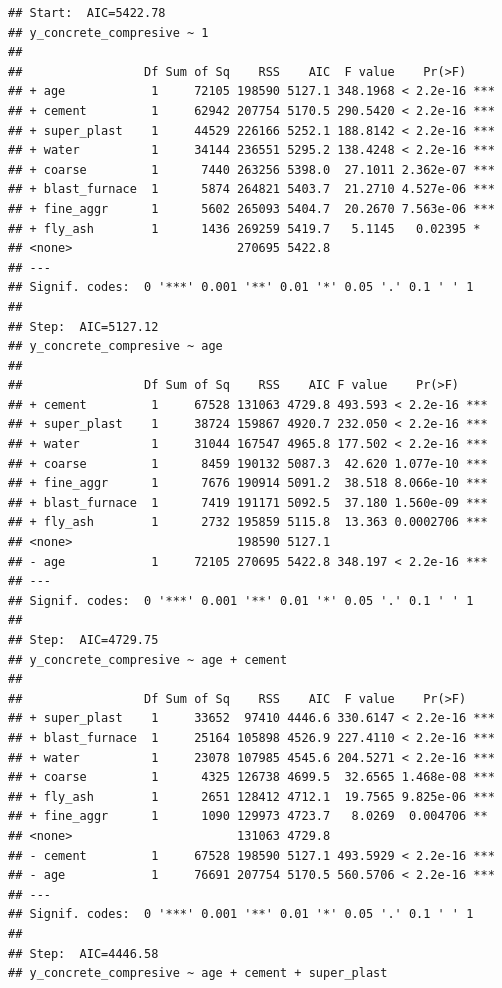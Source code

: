 \documentclass[
  12pt,
]{article}
\begin{document}
\begin{verbatim}
## Start:  AIC=5422.78
## y_concrete_compresive ~ 1
## 
##                 Df Sum of Sq    RSS    AIC  F value    Pr(>F)    
## + age            1     72105 198590 5127.1 348.1968 < 2.2e-16 ***
## + cement         1     62942 207754 5170.5 290.5420 < 2.2e-16 ***
## + super_plast    1     44529 226166 5252.1 188.8142 < 2.2e-16 ***
## + water          1     34144 236551 5295.2 138.4248 < 2.2e-16 ***
## + coarse         1      7440 263256 5398.0  27.1011 2.362e-07 ***
## + blast_furnace  1      5874 264821 5403.7  21.2710 4.527e-06 ***
## + fine_aggr      1      5602 265093 5404.7  20.2670 7.563e-06 ***
## + fly_ash        1      1436 269259 5419.7   5.1145   0.02395 *  
## <none>                       270695 5422.8                       
## ---
## Signif. codes:  0 '***' 0.001 '**' 0.01 '*' 0.05 '.' 0.1 ' ' 1
## 
## Step:  AIC=5127.12
## y_concrete_compresive ~ age
## 
##                 Df Sum of Sq    RSS    AIC F value    Pr(>F)    
## + cement         1     67528 131063 4729.8 493.593 < 2.2e-16 ***
## + super_plast    1     38724 159867 4920.7 232.050 < 2.2e-16 ***
## + water          1     31044 167547 4965.8 177.502 < 2.2e-16 ***
## + coarse         1      8459 190132 5087.3  42.620 1.077e-10 ***
## + fine_aggr      1      7676 190914 5091.2  38.518 8.066e-10 ***
## + blast_furnace  1      7419 191171 5092.5  37.180 1.560e-09 ***
## + fly_ash        1      2732 195859 5115.8  13.363 0.0002706 ***
## <none>                       198590 5127.1                      
## - age            1     72105 270695 5422.8 348.197 < 2.2e-16 ***
## ---
## Signif. codes:  0 '***' 0.001 '**' 0.01 '*' 0.05 '.' 0.1 ' ' 1
## 
## Step:  AIC=4729.75
## y_concrete_compresive ~ age + cement
## 
##                 Df Sum of Sq    RSS    AIC  F value    Pr(>F)    
## + super_plast    1     33652  97410 4446.6 330.6147 < 2.2e-16 ***
## + blast_furnace  1     25164 105898 4526.9 227.4110 < 2.2e-16 ***
## + water          1     23078 107985 4545.6 204.5271 < 2.2e-16 ***
## + coarse         1      4325 126738 4699.5  32.6565 1.468e-08 ***
## + fly_ash        1      2651 128412 4712.1  19.7565 9.825e-06 ***
## + fine_aggr      1      1090 129973 4723.7   8.0269  0.004706 ** 
## <none>                       131063 4729.8                       
## - cement         1     67528 198590 5127.1 493.5929 < 2.2e-16 ***
## - age            1     76691 207754 5170.5 560.5706 < 2.2e-16 ***
## ---
## Signif. codes:  0 '***' 0.001 '**' 0.01 '*' 0.05 '.' 0.1 ' ' 1
## 
## Step:  AIC=4446.58
## y_concrete_compresive ~ age + cement + super_plast

\end{verbatim}
\end{document}
